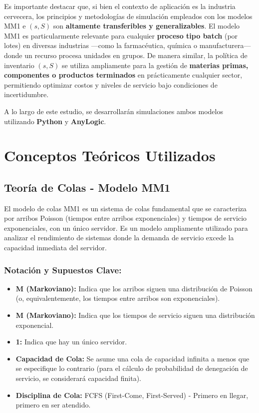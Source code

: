 \documentclass{article}
\begin{document}
Es importante destacar que, si bien el contexto de aplicación es la industria cervecera, los principios y metodologías de simulación empleados con los modelos MM1 e $(s,S)$ son \textbf{altamente transferibles y generalizables}. El modelo MM1 es particularmente relevante para cualquier \textbf{proceso tipo batch} (por lotes) en diversas industrias ---como la farmacéutica, química o manufacturera--- donde un recurso procesa unidades en grupos. De manera similar, la política de inventario $(s,S)$ se utiliza ampliamente para la gestión de \textbf{materias primas, componentes o productos terminados} en prácticamente cualquier sector, permitiendo optimizar costos y niveles de servicio bajo condiciones de incertidumbre.


A lo largo de este estudio, se desarrollarán simulaciones ambos modelos utilizando \textbf{Python} y \textbf{AnyLogic}.
\section{Conceptos Teóricos Utilizados}


\subsection{Teoría de Colas - Modelo MM1}
El modelo de colas MM1 es un sistema de colas fundamental que se caracteriza por arribos Poisson (tiempos entre arribos exponenciales) y tiempos de servicio exponenciales, con un único servidor. Es un modelo ampliamente utilizado para analizar el rendimiento de sistemas donde la demanda de servicio excede la capacidad inmediata del servidor.


\subsubsection*{Notación y Supuestos Clave:}
\begin{itemize}
    \item \textbf{M (Markoviano):} Indica que los arribos siguen una distribución de Poisson (o, equivalentemente, los tiempos entre arribos son exponenciales).
    \item \textbf{M (Markoviano):} Indica que los tiempos de servicio siguen una distribución exponencial.
    \item \textbf{1:} Indica que hay un único servidor.
    \item \textbf{Capacidad de Cola:} Se asume una cola de capacidad infinita a menos que se especifique lo contrario (para el cálculo de probabilidad de denegación de servicio, se considerará capacidad finita).
    \item \textbf{Disciplina de Cola:} FCFS (First-Come, First-Served) - Primero en llegar, primero en ser atendido.
\end{itemize}
\end{document}
